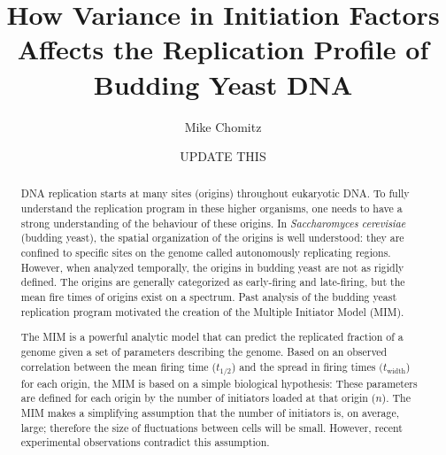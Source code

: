 \documentclass[serif]{sfuthesis}
\title{How Variance in Initiation Factors Affects the Replication Profile of Budding Yeast DNA}
\author{Mike Chomitz}
\date{UPDATE THIS}
\begin{document}
\frontmatter
\maketitle %
\makecommittee %
\makecopyrightdeclaration %

\begin{abstract}
	DNA replication starts at many sites (origins) throughout eukaryotic DNA.
	To fully understand the replication program in these higher organisms, one needs to have a strong understanding of the behaviour of these origins.
	In \emph{Saccharomyces cerevisiae} (budding yeast), the spatial organization of the origins is well understood: they are confined to specific sites on the genome called autonomously replicating regions.
	However, when analyzed temporally, the origins in budding yeast are not as rigidly defined.
	The origins are generally categorized as early-firing and late-firing, but the mean fire times of origins exist on a spectrum.
	Past analysis of the budding yeast replication program motivated the creation of the Multiple Initiator Model (MIM).
	
	The MIM is a powerful analytic model that can predict the replicated fraction of a genome given a set of parameters describing the genome.
	Based on an observed correlation between the mean firing time ($t_{1/2}$) and the spread in firing times $(t_\text{width}$) for each origin, the MIM is based on a simple biological hypothesis:
	These parameters are defined for each origin by the number of initiators loaded at that origin ($n$).
	The MIM makes a simplifying assumption that the number of initiators is, on average, large; therefore the size of fluctuations between cells will be small.
	However, recent experimental observations contradict this assumption.


\end{abstract}
\end{document}
